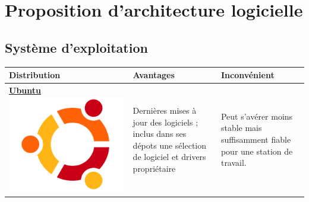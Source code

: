\chapter{Proposition d'architecture logicielle}

\section{Système d'exploitation}

\begin{table}[ht]
	\centering
	\begin{tabularx}{\textwidth}{|C|X|X|}
		\hline
		\textbf{Distribution} & \textbf{Avantages} & \textbf{Inconvénient} \\
		\hline
		\href{https://ubuntu.com}{\textbf{Ubuntu}\vspace{5px} \centering \includegraphics[width=0.7\linewidth]{images/Ubuntu}} & Dernières mises à jour des logiciels ; inclus dans ses dépots une sélection de logiciel et drivers propriétaire & Peut s'avérer moins stable mais suffisamment fiable pour une station de travail. \\
		\hline

\end{tabularx}
\end{table}
